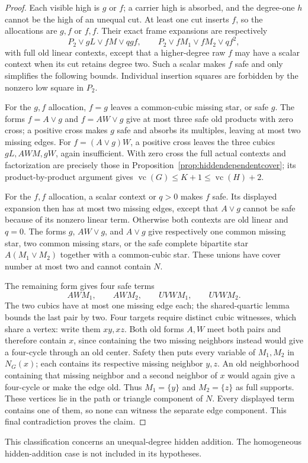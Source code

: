 \documentclass[11pt]{article}
\newcommand{\vc}{\operatorname{vc}}
\theoremstyle{definition}
\theoremstyle{remark}
\begin{document}
\begin{proof}
Each visible high is $g$ or $f$; a carrier high is absorbed, and the degree-one $h$ cannot be the high of an unequal cut. At least one cut inserts $f$, so the allocations are $g,f$ or $f,f$. Their exact frame expansions are respectively
\[
 P_2\vee gL\vee fM\vee qgf,
 \qquad
 P_2\vee fM_1\vee fM_2\vee qf^2,
\]
with full old linear contexts, except that a higher-degree raw $f$ may have a scalar context when its cut retains degree two. Such a scalar makes $f$ safe and only simplifies the following bounds. Individual insertion squares are forbidden by the nonzero low square in $P_2$.

For the $g,f$ allocation, $f=g$ leaves a common-cubic missing star, or safe $g$. The forms $f=A\vee g$ and $f=AW\vee g$ give at most three safe old products with zero cross; a positive cross makes $g$ safe and absorbs its multiples, leaving at most two missing edges. For $f=(A\vee g)W$, a positive cross leaves the three cubics $gL,AWM,gW$, again insufficient. With zero cross the full actual contexts and factorization are precisely those in Proposition~\ref{prop:hiddendependentcover}; its product-by-product argument gives $\vc(G)\le K+1\le\vc(H)+2$.

For the $f,f$ allocation, a scalar context or $q>0$ makes $f$ safe. Its displayed expansion then has at most two missing edges, except that $A\vee g$ cannot be safe because of its nonzero linear term. Otherwise both contexts are old linear and $q=0$. The forms $g$, $AW\vee g$, and $A\vee g$ give respectively one common missing star, two common missing stars, or the safe complete bipartite star $A(M_1\vee M_2)$ together with a common-cubic star. These unions have cover number at most two and cannot contain $N$.

The remaining form gives four safe terms
\[
 AWM_1,\qquad AWM_2,\qquad UVWM_1,\qquad UVWM_2.
\]
The two cubics have at most one missing edge each; the shared-quartic lemma bounds the last pair by two. Four targets require distinct cubic witnesses, which share a vertex: write them $xy,xz$. Both old forms $A,W$ meet both pairs and therefore contain $x$, since containing the two missing neighbors instead would give a four-cycle through an old center. Safety then puts every variable of $M_1,M_2$ in $N_G(x)$; each contains its respective missing neighbor $y,z$. An old neighborhood containing that missing neighbor and a second neighbor of $x$ would again give a four-cycle or make the edge old. Thus $M_1=\{y\}$ and $M_2=\{z\}$ as full supports. These vertices lie in the path or triangle component of $N$. Every displayed term contains one of them, so none can witness the separate edge component. This final contradiction proves the claim.
\end{proof}
This classification concerns an unequal-degree hidden addition. The homogeneous hidden-addition case is not included in its hypotheses.
\end{document}
